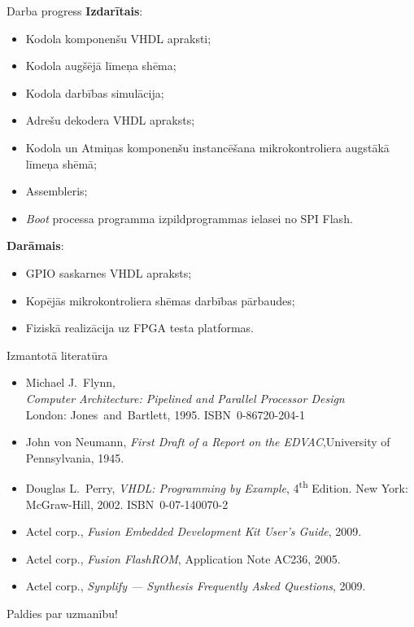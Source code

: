 \documentclass[xetex]{beamer} %
\newcommand{\termEn}[1]{\textenglish{\itshape {#1}}} %
\newcommand{\nth}{\textsuperscript{th} }
\begin{document}
	\begin{frame}{Darba progress}
		\textbf{Izdarītais}:
		\begin{itemize}\small
			\item Kodola komponenšu VHDL apraksti;
			\item Kodola augšējā līmeņa shēma;
			\item Kodola darbības simulācija;
			\item Adrešu dekodera VHDL apraksts;
			\item Kodola un Atmiņas komponenšu instancēšana mikrokontroliera
				augstākā līmeņa shēmā;
			\item Assembleris;
			\item \termEn{Boot} processa programma izpildprogrammas ielasei
				no SPI Flash.
		\end{itemize}
		\textbf{Darāmais}:
		\begin{itemize}\small
			\item GPIO saskarnes VHDL apraksts;
			\item Kopējās mikrokontroliera shēmas darbības pārbaudes;
			\item Fiziskā realizācija uz FPGA testa platformas.
		\end{itemize}
	\end{frame}
	
	\begin{frame}{Izmantotā literatūra}
		\begin{itemize} \small
			\item Michael J.~Flynn,\\
				\textit{Computer Architecture: Pipelined and Parallel Processor Design}\\
				London: Jones~and~Bartlett, 1995. ISBN~0-86720-204-1
			\item John von Neumann,
				\textit{First Draft of a Report on the EDVAC},\linebreak[2]
				University of Pennsylvania, 1945.
			\item Douglas L.~Perry,
				\textit{VHDL: Programming by Example}, 4\nth Edition. \linebreak[2]
				New York: McGraw-Hill, 2002. ISBN~0-07-140070-2
			\item Actel corp.,
				\textit{Fusion Embedded Development Kit User's Guide}, %
				2009.
			\item Actel corp.,
				\textit{Fusion FlashROM}, Application Note AC236, %
				2005.
			\item Actel corp.,
				\textit{Synplify — Synthesis Frequently Asked Questions}, %
				2009.
		\end{itemize}
	\end{frame}
	
	\begin{frame}
		\begin{center}
			\Large Paldies par uzmanību!\\[2em]
		\end{center}
	\end{frame}
	
\end{document}

